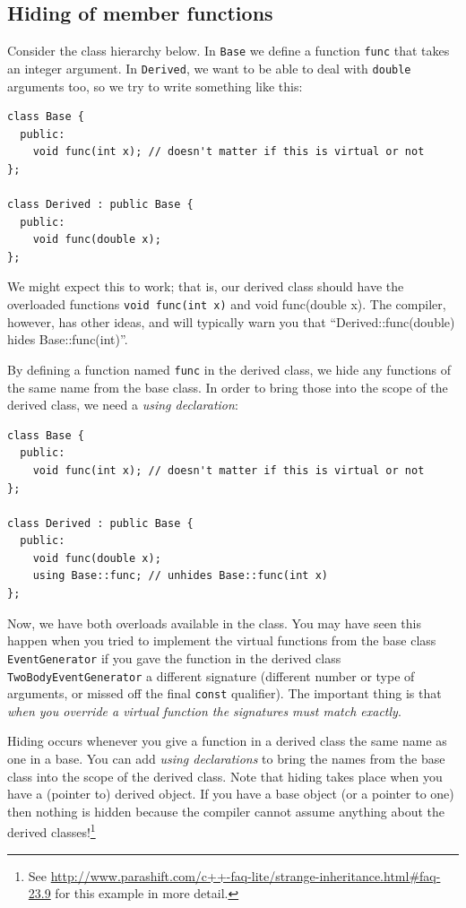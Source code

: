 \documentclass[a4paper]{scrartcl}
\begin{document}
\subsection{Hiding of member functions}
Consider the class hierarchy below. In \verb|Base| we define a function \verb|func| that takes an integer argument. In \verb|Derived|, we want to be able to deal with \verb|double| arguments too, so we try to write something like this:
\begin{verbatim}
class Base {
  public:
    void func(int x); // doesn't matter if this is virtual or not
};

class Derived : public Base {
  public:
    void func(double x);
};
\end{verbatim}

We might expect this to work; that is, our derived class should have the overloaded functions \texttt{void func(int x)} and {void func(double x)}. The compiler, however, has other ideas, and will typically warn you that ``Derived::func(double) hides Base::func(int)''.

By defining a function named \verb|func| in the derived class, we hide any functions of the same name from the base class. In order to bring those into the scope of the derived class, we need a \emph{using declaration}:
\begin{verbatim}
class Base {
  public:
    void func(int x); // doesn't matter if this is virtual or not
};

class Derived : public Base {
  public:
    void func(double x);
    using Base::func; // unhides Base::func(int x)
};
\end{verbatim}

Now, we have both overloads available in the class. You may have seen this happen when you tried to implement the virtual functions from the base class \verb|EventGenerator| if you gave the function in the derived class \verb|TwoBodyEventGenerator| a different signature (different number or type of arguments, or missed off the final \verb|const| qualifier). The important thing is that \emph{when you override a virtual function the signatures must match exactly}.

Hiding occurs whenever you give a function in a derived class the same name as one in a base. You can add \emph{using declarations} to bring the names from the base class into the scope of the derived class. Note that hiding takes place when you have a (pointer to) derived object. If you have a base object (or a pointer to one) then nothing is hidden because the compiler cannot assume anything about the derived classes!\footnote{See \url{http://www.parashift.com/c++-faq-lite/strange-inheritance.html\#faq-23.9} for this example in more detail.}
\end{document}
